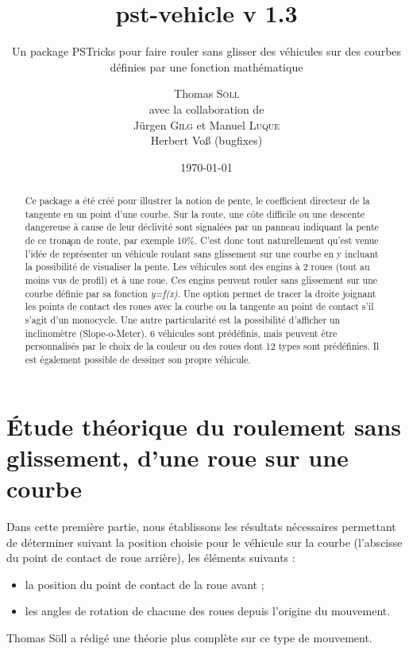\documentclass[11pt,english,BCOR=10mm,DIV=12,bibliography=totoc,parskip=false,headings=small,
    headinclude=false,footinclude=false,oneside]{pst-doc}
\begin{document}
\title{pst-vehicle v 1.3}
\subtitle{Un package PSTricks pour faire rouler sans glisser des véhicules sur des courbes définies par une fonction mathématique}
\author{Thomas \textsc{Söll}\\
avec la collaboration de\\
Jürgen \textsc{Gilg}  et Manuel \textsc{Luque}\\
Herbert Voß (bugfixes)}
\date{\today}

\settitle

\tableofcontents
{}


\clearpage


\begin{abstract}
Ce package a été créé pour illustrer la notion de pente, le coefficient directeur de la tangente en un point d'une courbe. Sur la route, une côte difficile ou une descente dangereuse à cause de leur déclivité sont signalées par un panneau 
indiquant la pente de ce tron\c{a}on de route, par exemple 10\%. C'est donc tout naturellement qu'est venue l'idée de représenter un véhicule roulant sans glissement sur une courbe en y incluant la possibilité de visualiser la pente.
\newline
Les véhicules sont des engins à 2 roues (tout au moins vus de profil) et à une roue. Ces engins peuvent rouler sans glissement sur une courbe définie par sa fonction \textit{y=f(x)}.
Une option permet de tracer la droite joignant les points de contact des roues avec la courbe ou la tangente au point de contact s'il s'agit d'un monocycle.
Une autre particularité est la possibilité d'afficher un inclinomètre (Slope-o-Meter).
6 véhicules sont prédéfinis, mais peuvent être personnalisés par le choix de la couleur ou des roues dont 12 types sont prédéfinies.
Il est également possible de dessiner son propre véhicule.
\end{abstract}
\clearpage

\section{Étude théorique du roulement sans glissement, d'une roue sur une courbe}
Dans cette première partie, nous établissons les résultats nécessaires permettant de déterminer suivant la position choisie pour le véhicule sur la courbe (l'abscisse du point de contact de roue arrière), les éléments suivants :
\begin{itemize}
  \item la position du point de contact de la roue avant ;
  \item les angles de rotation de chacune des roues depuis l'origine du mouvement.
\end{itemize}
Thomas Söll a rédigé une théorie plus complète sur ce type de mouvement.
\end{document}
